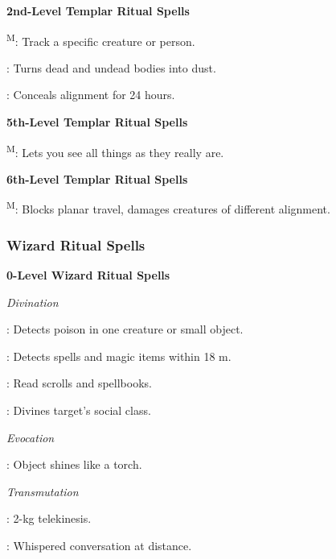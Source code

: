 \noindent\textbf{2nd-Level Templar Ritual Spells}
\begin{itemize*}
	\item[] \textsuperscript{M}: Track a specific creature or person.
	\item[] : Turns dead and undead bodies into dust.
	\item[] : Conceals alignment for 24 hours.
\end{itemize*}

\noindent\textbf{5th-Level Templar Ritual Spells}
\begin{itemize*}
	\item[] \textsuperscript{M}: Lets you see all things as they really are.
\end{itemize*}

\noindent\textbf{6th-Level Templar Ritual Spells}
\begin{itemize*}
	\item[] \textsuperscript{M}: Blocks planar travel, damages creatures of different alignment.
\end{itemize*}




\subsubsection{Wizard Ritual Spells}
\noindent\textbf{0-Level Wizard Ritual Spells}

\noindent\textit{Divination}
\begin{itemize*}
	\item[] : Detects poison in one creature or small object.
	\item[] : Detects spells and magic items within 18 m.
	\item[] : Read scrolls and spellbooks.
	\item[] : Divines target's social class. %
\end{itemize*}

\noindent\textit{Evocation}
\begin{itemize*}
	\item[] : Object shines like a torch.
\end{itemize*}

\noindent\textit{Transmutation}
\begin{itemize*}
	\item[] : 2-kg telekinesis.
	\item[] : Whispered conversation at distance.
\end{itemize*}

